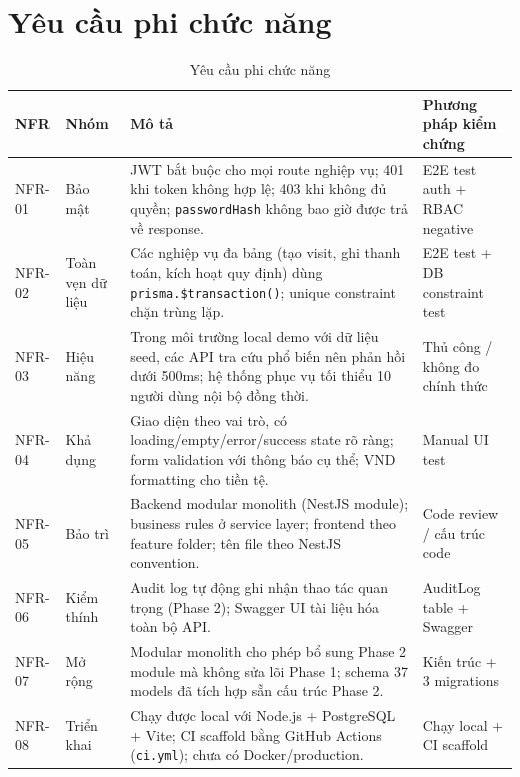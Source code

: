 \section{Yêu cầu phi chức năng}
\label{sec:srs-nonfunctional}

\begin{table}[H]
\centering
\caption{Yêu cầu phi chức năng}
\label{tab:srs-nfr}
\begin{tabularx}{\textwidth}{|p{1.3cm}|p{2.6cm}|X|p{3.0cm}|}
\hline
\textbf{NFR} & \textbf{Nhóm} & \textbf{Mô tả} & \textbf{Phương pháp kiểm chứng} \\
\hline
NFR-01 & Bảo mật & JWT bắt buộc cho mọi route nghiệp vụ; 401 khi token không hợp lệ; 403 khi không đủ quyền; \texttt{passwordHash} không bao giờ được trả về response. & E2E test auth + RBAC negative \\
\hline
NFR-02 & Toàn vẹn dữ liệu & Các nghiệp vụ đa bảng (tạo visit, ghi thanh toán, kích hoạt quy định) dùng \verb|prisma.$transaction()|; unique constraint chặn trùng lặp. & E2E test + DB constraint test \\
\hline
NFR-03 & Hiệu năng & Trong môi trường local demo với dữ liệu seed, các API tra cứu phổ biến nên phản hồi dưới 500ms; hệ thống phục vụ tối thiểu 10 người dùng nội bộ đồng thời. & Thủ công / không đo chính thức \\
\hline
NFR-04 & Khả dụng & Giao diện theo vai trò, có loading/empty/error/success state rõ ràng; form validation với thông báo cụ thể; VND formatting cho tiền tệ. & Manual UI test \\
\hline
NFR-05 & Bảo trì & Backend modular monolith (NestJS module); business rules ở service layer; frontend theo feature folder; tên file theo NestJS convention. & Code review / cấu trúc code \\
\hline
NFR-06 & Kiểm thính & Audit log tự động ghi nhận thao tác quan trọng (Phase 2); Swagger UI tài liệu hóa toàn bộ API. & AuditLog table + Swagger \\
\hline
NFR-07 & Mở rộng & Modular monolith cho phép bổ sung Phase 2 module mà không sửa lõi Phase 1; schema 37 models đã tích hợp sẵn cấu trúc Phase 2. & Kiến trúc + 3 migrations \\
\hline
NFR-08 & Triển khai & Chạy được local với Node.js + PostgreSQL + Vite; CI scaffold bằng GitHub Actions (\texttt{ci.yml}); chưa có Docker/production. & Chạy local + CI scaffold \\
\hline
\end{tabularx}
\end{table}


